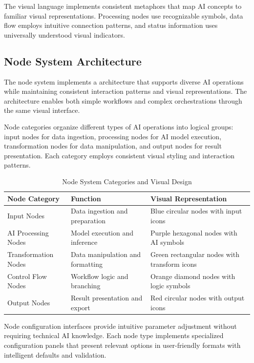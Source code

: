 The visual language implements consistent metaphors that map AI concepts to familiar visual representations. Processing nodes use recognizable symbols, data flow employs intuitive connection patterns, and status information uses universally understood visual indicators.

\subsection*{Node System Architecture}

The node system implements a architecture that supports diverse AI operations while maintaining consistent interaction patterns and visual representations. The architecture enables both simple workflows and complex orchestrations through the same visual interface.

Node categories organize different types of AI operations into logical groups: input nodes for data ingestion, processing nodes for AI model execution, transformation nodes for data manipulation, and output nodes for result presentation. Each category employs consistent visual styling and interaction patterns.

\begin{table}[ht]
\centering
\begin{tabular}{@{}lll@{}}
\toprule
\textbf{Node Category} & \textbf{Function} & \textbf{Visual Representation} \\
\midrule
Input Nodes & Data ingestion and preparation & Blue circular nodes with input icons \\
AI Processing Nodes & Model execution and inference & Purple hexagonal nodes with AI symbols \\
Transformation Nodes & Data manipulation and formatting & Green rectangular nodes with transform icons \\
Control Flow Nodes & Workflow logic and branching & Orange diamond nodes with logic symbols \\
Output Nodes & Result presentation and export & Red circular nodes with output icons \\
\bottomrule
\end{tabular}
\caption{Node System Categories and Visual Design}
\end{table}

Node configuration interfaces provide intuitive parameter adjustment without requiring technical AI knowledge. Each node type implements specialized configuration panels that present relevant options in user-friendly formats with intelligent defaults and validation.

